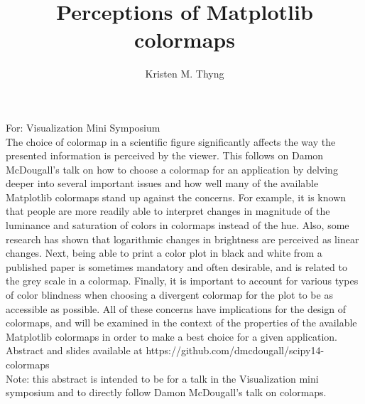 \documentclass[11pt]{article}
\title{Perceptions of Matplotlib colormaps}
\author{Kristen M. Thyng}
\date{}
\begin{document}
\maketitle

For: Visualization Mini Symposium \\

The choice of colormap in a scientific figure significantly affects the way the presented information is perceived by the viewer. This follows on Damon McDougall's talk on how to choose a colormap for an application by delving deeper into several important issues and how well many of the available Matplotlib colormaps stand up against the concerns. For example, it is known that people are more readily able to interpret changes in magnitude of the luminance and saturation of colors in colormaps instead of the hue. Also, some research has shown that logarithmic changes in brightness are perceived as linear changes. Next, being able to print a color plot in black and white from a published paper is sometimes mandatory and often desirable, and is related to the grey scale in a colormap. Finally, it is important to account for various types of color blindness when choosing a divergent colormap for the plot to be as accessible as possible. All of these concerns have implications for the design of colormaps, and will be examined in the context of the properties of the available Matplotlib colormaps in order to make a best choice for a given application. \\

Abstract and slides available at https://github.com/dmcdougall/scipy14-colormaps \\

Note: this abstract is intended to be for a talk in the Visualization mini symposium and to directly follow Damon McDougall's talk on colormaps.
\end{document}
